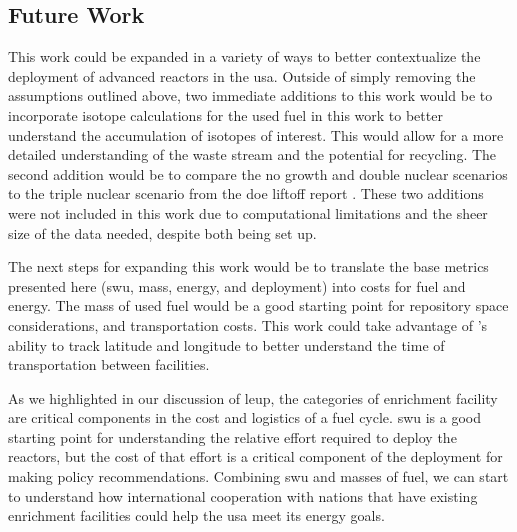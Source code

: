 


\subsection{Future Work}
\label{sec:future_work}

This work could be expanded in a variety of ways to better contextualize the deployment of advanced reactors in the \gls{usa}. Outside of simply removing the assumptions outlined above, two immediate additions to this work would be to incorporate isotope calculations for the used fuel in this work to better understand the accumulation of isotopes of interest. This would allow for a more detailed understanding of the waste stream and the potential for recycling. The second addition would be to compare the no growth and double nuclear scenarios to the triple nuclear scenario from the \gls{doe} liftoff report \cite{julie_liftoff_pathways_2024}. These two additions were not included in this work due to computational limitations and the sheer size of the data needed, despite both being set up.

The next steps for expanding this work would be to translate the base metrics presented here (\gls{swu}, mass, energy, and deployment) into costs for fuel and energy. The mass of used fuel would be a good starting point for repository space considerations, and transportation costs. This work could take advantage of \cyclus's ability to track latitude and longitude to better understand the time of transportation between facilities.

As we highlighted in our discussion of \gls{leup}, the categories of enrichment facility are critical components in the cost and logistics of a fuel cycle. \gls{swu} is a good starting point for understanding the relative effort required to deploy the reactors, but the cost of that effort is a critical component of the deployment for making policy recommendations. Combining \gls{swu} and masses of fuel, we can start to understand how international cooperation with nations that have existing enrichment facilities could help the \gls{usa} meet its energy goals.

